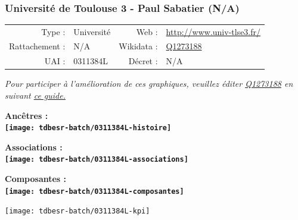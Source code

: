 \documentclass[12pt,french,]{article}
\begin{document}
\ifoddpage ~\newpage \fi   

\hypertarget{universituxe9-de-toulouse-3---paul-sabatier-na}{%
\subsubsection{Université de Toulouse 3 - Paul Sabatier
(N/A)}\label{universituxe9-de-toulouse-3---paul-sabatier-na}}

\begin{tabular*}{\textwidth}{rp{5cm}rl}  
\hline  
Type : & Université & Web : &\href{http://www.univ-tlse3.fr/}{http://www.univ-tlse3.fr/} \\  
Rattachement : & N/A & Wikidata : & \href{https://www.wikidata.org/entity/Q1273188}{Q1273188} \\  
UAI : & 0311384L & Décret : & N/A \\  
\hline  
\end{tabular*}

\textit{\scriptsize Pour participer à l'amélioration de ces graphiques, veuillez éditer  \href{https://www.wikidata.org/entity/Q1273188}{Q1273188}  en suivant \href{https://github.com/cpesr/wikidataESR/blob/master/Rmd/wikidataESR.md}{ce guide.}}

\vspace{1cm}  
\begin{minipage}[b]{0.50\textwidth}\begin{center} \bf Ancêtres : \\  
\texttt{[image: tdbesr-batch/0311384L-histoire]} \end{center}\end{minipage}\begin{minipage}[b]{0.50\textwidth}\begin{center} \bf Associations : \\  
\texttt{[image: tdbesr-batch/0311384L-associations]} \end{center}\end{minipage}

\hrulefill

\begin{center} \bf Composantes : \\  
\texttt{[image: tdbesr-batch/0311384L-composantes]} \end{center}

\begin{center}\texttt{[image: tdbesr-batch/0311384L-kpi]} \end{center}\checkoddpage
\end{document}
